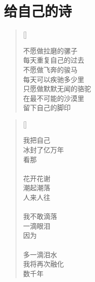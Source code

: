 \chapter{给自己的诗}
\thispagestyle{empty}
\renewcommand{\poemtoc}{section}
\settowidth{\versewidth}{不愿做拉磨的骡子}
\begin{verse}[\versewidth]

不愿做拉磨的骡子\\
每天重复自己的过去\\
不愿做飞奔的骏马\\
每天可以疾驰多少里\\
只愿做默默无闻的骆驼\\
在最不可能的沙漠里\\
留下自己的脚印
\end{verse}


\renewcommand{\poemtoc}{section}
\settowidth{\versewidth}{我把自己}
\begin{verse}[\versewidth]

我把自己\\
冰封了亿万年\\
看那\\
~\\
花开花谢\\
潮起潮落\\
人来人往\\
~\\
我不敢滴落\\
一滴眼泪\\
因为\\
~\\
多一滴泪水\\
我将再次融化\\
数千年
\end{verse}
